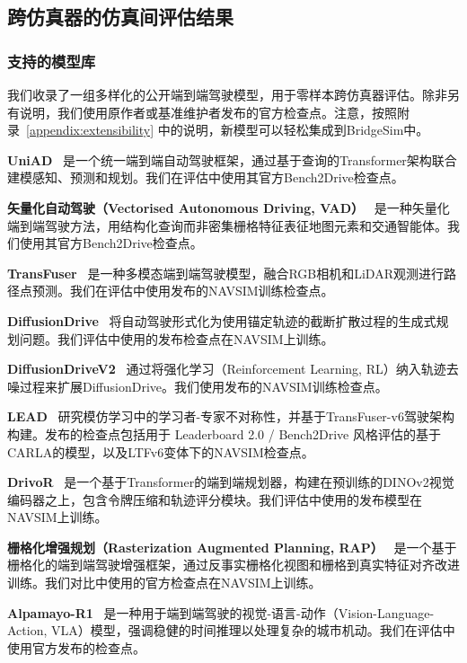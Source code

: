 \documentclass{article}
\begin{document}
\subsection{跨仿真器的仿真间评估结果}

\subsubsection{支持的模型库}
我们收录了一组多样化的公开端到端驾驶模型，用于零样本跨仿真器评估。除非另有说明，我们使用原作者或基准维护者发布的官方检查点。注意，按照附录~\ref{appendix:extensibility} 中的说明，新模型可以轻松集成到BridgeSim中。

\textbf{UniAD}~\cite{uniad} 是一个统一端到端自动驾驶框架，通过基于查询的Transformer架构联合建模感知、预测和规划。我们在评估中使用其官方Bench2Drive检查点。

\textbf{矢量化自动驾驶（Vectorised Autonomous Driving, VAD）}~\cite{vad} 是一种矢量化端到端驾驶方法，用结构化查询而非密集栅格特征表征地图元素和交通智能体。我们使用其官方Bench2Drive检查点。

\textbf{TransFuser}~\cite{transfuser} 是一种多模态端到端驾驶模型，融合RGB相机和LiDAR观测进行路径点预测。我们在评估中使用发布的NAVSIM训练检查点。

\textbf{DiffusionDrive}~\cite{diffusiondrive} 将自动驾驶形式化为使用锚定轨迹的截断扩散过程的生成式规划问题。我们评估中使用的发布检查点在NAVSIM上训练。

\textbf{DiffusionDriveV2}~\cite{diffusiondrivev2} 通过将强化学习（Reinforcement Learning, RL）纳入轨迹去噪过程来扩展DiffusionDrive。我们使用发布的NAVSIM训练检查点。

\textbf{LEAD}~\cite{LEAD} 研究模仿学习中的学习者-专家不对称性，并基于TransFuser-v6驾驶架构构建。发布的检查点包括用于 Leaderboard 2.0 / Bench2Drive 风格评估的基于CARLA的模型，以及LTFv6变体下的NAVSIM检查点。

\textbf{DrivoR}~\cite{DrivoR} 是一个基于Transformer的端到端规划器，构建在预训练的DINOv2视觉编码器之上，包含令牌压缩和轨迹评分模块。我们评估中使用的发布模型在NAVSIM上训练。

\textbf{栅格化增强规划（Rasterization Augmented Planning, RAP）}~\cite{RAP} 是一个基于栅格化的端到端驾驶增强框架，通过反事实栅格化视图和栅格到真实特征对齐改进训练。我们对比中使用的官方检查点在NAVSIM上训练。

\textbf{Alpamayo-R1}~\cite{wang2025alpamayo} 是一种用于端到端驾驶的视觉-语言-动作（Vision-Language-Action, VLA）模型，强调稳健的时间推理以处理复杂的城市机动。我们在评估中使用官方发布的检查点。
\end{document}
